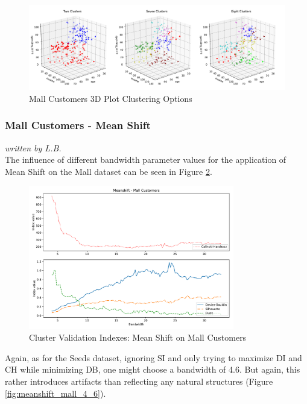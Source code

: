 \begin{figure}[H]
\begin{center}
\includegraphics[width=1.0\textwidth]{images/kmeans_mall_3d_multi.pdf}
\caption{Mall Customers 3D Plot Clustering Options}
\end{center}
\label{fig:kmeans_customers_3d_multi}
\end{figure}
\vspace{-0.5cm}


\subsubsection{Mall Customers - Mean Shift}
\textit{written by L.B.}\\

The influence of different bandwidth parameter values for the application of Mean Shift on the Mall dataset can be seen in Figure \ref{fig:meanshift_mall}.

\begin{figure}[!ht]
\begin{center}
\includegraphics[width=0.8\textwidth]{images/Meanshift_-_Mall_Customers.pdf}
\caption{Cluster Validation Indexes: Mean Shift on Mall Customers}
\end{center}
\label{fig:meanshift_mall}
\end{figure}
Again, as for the Seeds dataset, ignoring SI and only trying to maximize DI and CH while minimizing DB, one might choose a bandwidth of 4.6. But again, this rather introduces artifacts than reflecting any natural structures (Figure \ref{fig:meanshift_mall_4_6}).

